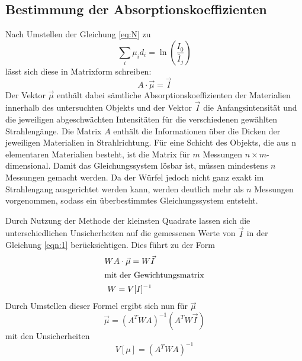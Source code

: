 \subsection{Bestimmung der Absorptionskoeffizienten}
Nach Umstellen der Gleichung \eqref{eq:N} zu
\begin{equation}
  \sum_i\mu_i d_i = \ln\left(\frac{I_0}{\bar{I}_j}\right)
\end{equation}
lässt sich diese in Matrixform schreiben:
\begin{equation}
  A\cdot\vec{\mu} = \vec{I}
  \label{eqn:1}
\end{equation}
Der Vektor $\vec{\mu}$ enthält dabei sämtliche Absorptionskoeffizienten der Materialien innerhalb des untersuchten Objekts und der Vektor $\vec{I}$ die Anfangsintensität und die jeweiligen abgeschwächten
Intensitäten für die verschiedenen gewählten Strahlengänge. Die Matrix $A$ enthält die Informationen über die Dicken der jeweiligen Materialien in Strahlrichtung. Für eine Schicht des Objekts, die aus
n elementaren Materialien besteht, ist die Matrix für $m$ Messungen $n\times m$-dimensional. Damit das Gleichungssystem lösbar ist, müssen mindestens $n$
Messungen gemacht werden. Da der Würfel jedoch nicht ganz exakt im Strahlengang ausgerichtet werden kann, werden deutlich mehr als $n$ Messungen vorgenommen, sodass ein
überbestimmtes Gleichungssystem entsteht.

Durch Nutzung der Methode der kleinsten Quadrate lassen sich die unterschiedlichen Unsicherheiten auf die gemessenen Werte von $\vec{I}$ in der Gleichung \ref{eqn:1} berücksichtigen. Dies führt zu der Form
\begin{gather}
  WA\cdot\vec{\mu}=W\vec{I} \\
  \intertext{mit der Gewichtungsmatrix}
  W=V[I]^{-1}
  \label{eqn:gewicht}
\end{gather}
Durch Umstellen dieser Formel ergibt sich nun für $\vec{\mu}$
\begin{equation}
  \vec{\mu}=\left(A^TWA\right)^{-1}\left(A^TW\vec{I}\right)
\end{equation}
mit den Unsicherheiten
\begin{equation}
  V[\mu]=\left(A^TWA\right)^{-1}
  \label{eqn:mu}
\end{equation}
